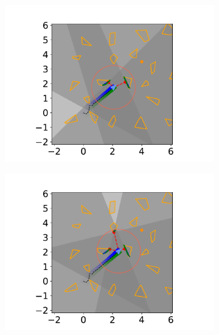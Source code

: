 \begin{figure}[h]
    \begin{subfigure}{0.20\textwidth}
        \centering
        \includegraphics[width=\textwidth]{../figures/Simulations/sim2unkenv/frame_5.pdf}
    \end{subfigure}%
    \hfill
    \begin{subfigure}{0.20\textwidth}
        \centering
        \includegraphics[width=\textwidth]{../figures/Simulations/sim2unkenv/frame_6.pdf}
    \end{subfigure}%
    \hfill
    \begin{subfigure}{0.20\textwidth}
        \centering

\end{subfigure}
\end{figure}
